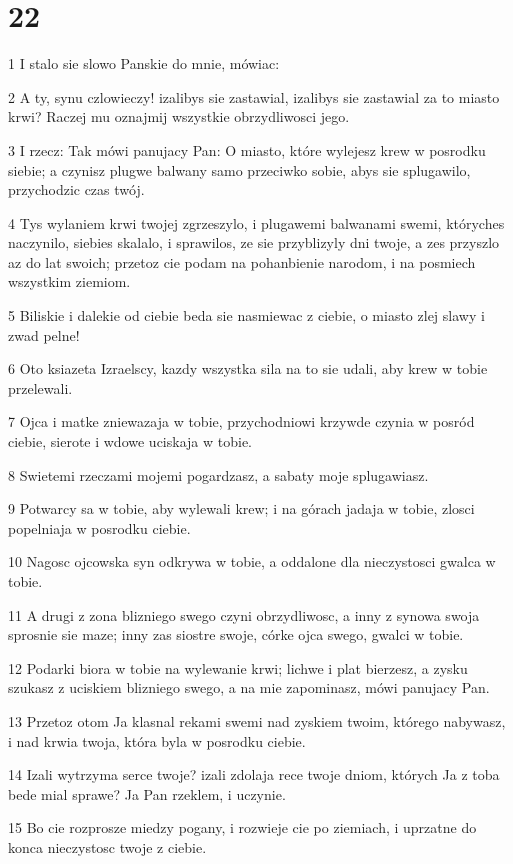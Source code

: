 \chapter{22}

\par 1 I stalo sie slowo Panskie do mnie, mówiac:
\par 2 A ty, synu czlowieczy! izalibys sie zastawial, izalibys sie zastawial za to miasto krwi? Raczej mu oznajmij wszystkie obrzydliwosci jego.
\par 3 I rzecz: Tak mówi panujacy Pan: O miasto, które wylejesz krew w posrodku siebie; a czynisz plugwe balwany samo przeciwko sobie, abys sie splugawilo, przychodzic czas twój.
\par 4 Tys wylaniem krwi twojej zgrzeszylo, i plugawemi balwanami swemi, któryches naczynilo, siebies skalalo, i sprawilos, ze sie przyblizyly dni twoje, a zes przyszlo az do lat swoich; przetoz cie podam na pohanbienie narodom, i na posmiech wszystkim ziemiom.
\par 5 Biliskie i dalekie od ciebie beda sie nasmiewac z ciebie, o miasto zlej slawy i zwad pelne!
\par 6 Oto ksiazeta Izraelscy, kazdy wszystka sila na to sie udali, aby krew w tobie przelewali.
\par 7 Ojca i matke zniewazaja w tobie, przychodniowi krzywde czynia w posród ciebie, sierote i wdowe uciskaja w tobie.
\par 8 Swietemi rzeczami mojemi pogardzasz, a sabaty moje splugawiasz.
\par 9 Potwarcy sa w tobie, aby wylewali krew; i na górach jadaja w tobie, zlosci popelniaja w posrodku ciebie.
\par 10 Nagosc ojcowska syn odkrywa w tobie, a oddalone dla nieczystosci gwalca w tobie.
\par 11 A drugi z zona blizniego swego czyni obrzydliwosc, a inny z synowa swoja sprosnie sie maze; inny zas siostre swoje, córke ojca swego, gwalci w tobie.
\par 12 Podarki biora w tobie na wylewanie krwi; lichwe i plat bierzesz, a zysku szukasz z uciskiem blizniego swego, a na mie zapominasz, mówi panujacy Pan.
\par 13 Przetoz otom Ja klasnal rekami swemi nad zyskiem twoim, którego nabywasz, i nad krwia twoja, która byla w posrodku ciebie.
\par 14 Izali wytrzyma serce twoje? izali zdolaja rece twoje dniom, których Ja z toba bede mial sprawe? Ja Pan rzeklem, i uczynie.
\par 15 Bo cie rozprosze miedzy pogany, i rozwieje cie po ziemiach, i uprzatne do konca nieczystosc twoje z ciebie.
